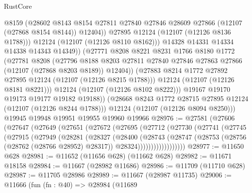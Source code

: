 \begin{lexlean}{RustCore}
\begin{coremodule}
                      @8159
                      (@28602
                        @8143
                        @8154
                        @27811
                        @27840
                        @27846
                        @28609
                        @27866
                        (@12107 (@27868 @8154 @8144))
                        @12404))
                    @27895
                    @12124
                    (@12107 (@12126 @8136 @1788)))
                  @12124
                  (@12107 (@12126 @8110 @8162)))
                @14328
                @14331
                @14334
                @14338
                @14343
                @14349))
            (@27771
              @8208
              @8221
              @8231
              @1766
              @8180
              @1772
              (@27781
                @8208
                (@27796
                  @8188
                  @8203
                  @27811
                  @27840
                  @27846
                  @27863
                  @27866
                  (@12107 (@27868 @8203 @8189))
                  @12404))
              (@27883 @8214 @1772 @27892 @27895 @12124 (@12107 (@12126 @8215 @1788)))
              @12124
              (@12107 (@12126 @8181 @8221)))
            @12124
            (@12107 (@12126 @8102 @8222)))
          @19167
          @19170
          @19173
          @19177
          @19182
          @19188))
      (@28668 @8243 @1772 @28715 @27895 @12124 (@12107 (@12126 @8244 @1788)))
      @12124
      (@12107 (@12126 @8094 @8250)))
    @19945
    @19948
    @19951
    @19955
    @19960
    @19966
@28976 := @27581
    (@27606
      (@27647
        (@27649
          (@27651
            (@27672
              (@27695
                (@27712
                  (@27730
                    (@27741
                      (@27745
                        (@27915
                          (@27949
                            (@28281
                              (@28327
                                (@28400
                                  (@28743
                                    (@28747
                                      (@28753
                                        (@28756 (@28762 (@28766 @28952) @28317))
                                        @28324))))))))))))))))))
@28977 := @11650 @628
@28981 := @11652 (@11656 @628) (@11662 @628)
@28982 := @11671 @18158
@28984 := @11667 (@28982 @11686)
@28986 := @11709 (@11710 @628)
@28987 := @11705 @28986
@28989 := @11667 (@28987 @11735)
@29006 := @11666
    (fun (fn : @40) =>
    @28984
      (@11689

\end{coremodule}
\end{lexlean}
